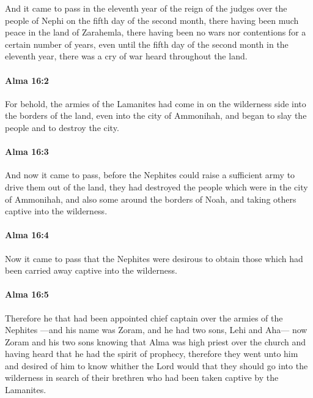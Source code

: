 			And it came to pass
			in the eleventh year of the reign of the judges over the people of Nephi
			on the fifth day of the second month,
			there having been much peace in the land of Zarahemla,
			there having been no wars nor contentions for a certain number of years,
			even until the fifth day of the second month in the eleventh year,
			there was a cry of war heard throughout the land.

		\paragraph{Alma 16:2} %
			\label{ALMA-16-2}

			For behold, the armies of the Lamanites had come in on the wilderness side
			into the borders of the land, even into the city of Ammonihah,
			and began to slay the people and to destroy the city.

		\paragraph{Alma 16:3} %
			\label{ALMA-16-3}

			And now it came to pass,
			before the Nephites could raise a sufficient army to drive them out of the land,
			they had destroyed the people which were in the city of Ammonihah,
			and also some around the borders of Noah,
			and taking others captive into the wilderness.

		\paragraph{Alma 16:4} %
			\label{ALMA-16-4}

			Now it came to pass that the Nephites were desirous to obtain those
			which had been carried away captive into the wilderness.

		\paragraph{Alma 16:5} %
			\label{ALMA-16-5}

			Therefore he that had been appointed chief captain over the armies of the Nephites
			---and his name was Zoram, and he had two sons, Lehi and Aha---
			now Zoram and his two sons knowing that Alma was high priest over the church
			and having heard that he had the spirit of prophecy,
			therefore they went unto him and desired of him
			to know whither the Lord would that they should go into the wilderness
			in search of their brethren who had been taken captive by the Lamanites.

